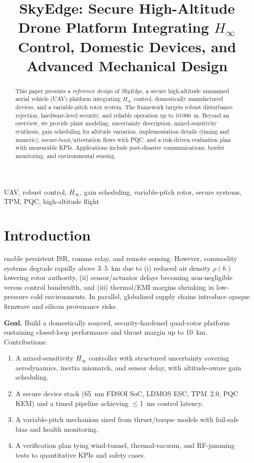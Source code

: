 \documentclass[conference]{IEEEtran}
\title{SkyEdge: Secure High-Altitude Drone Platform Integrating $H_\infty$ Control, Domestic Devices, and Advanced Mechanical Design}
\author{
\IEEEauthorblockN{Shinichi Samizo}
\IEEEauthorblockA{Independent Semiconductor Researcher \\
Project Design Hub, Samizo-AITL \\
\textit{Email:} \href{mailto:shin3t72@gmail.com}{shin3t72@gmail.com} \\
\textit{GitHub:} \href{https://github.com/Samizo-AITL}{Samizo-AITL}}
}
\begin{document}
\maketitle

\begin{abstract}
This paper presents a \emph{reference design} of \emph{SkyEdge}, a secure high-altitude unmanned aerial vehicle (UAV) platform integrating $H_\infty$ control, domestically manufactured devices, and a variable-pitch rotor system. The framework targets robust disturbance rejection, hardware-level security, and reliable operation up to 10\,000~m. Beyond an overview, we provide plant modeling, uncertainty description, mixed-sensitivity synthesis, gain scheduling for altitude variation, implementation details (timing and numeric), secure-boot/attestation flows with PQC, and a risk-driven evaluation plan with measurable KPIs. Applications include post-disaster communications, border monitoring, and environmental sensing.
\end{abstract}

\begin{IEEEkeywords}
UAV, robust control, $H_\infty$, gain scheduling, variable-pitch rotor, secure systems, TPM, PQC, high-altitude flight
\end{IEEEkeywords}

\section{Introduction}
 enable persistent ISR, comms relay, and remote sensing. However, commodity systems degrade rapidly above 3--5~km due to (i) reduced air density $\rho(h)$ lowering rotor authority, (ii) sensor/actuator delays becoming non-negligible versus control bandwidth, and (iii) thermal/EMI margins shrinking in low-pressure cold environments. In parallel, globalized supply chains introduce opaque firmware and silicon provenance risks.

\textbf{Goal.} Build a domestically sourced, security-hardened quad-rotor platform sustaining closed-loop performance and thrust margin up to 10~km. Contributions:
\begin{enumerate}
  \item A mixed-sensitivity $H_\infty$ controller with structured uncertainty covering aerodynamics, inertia mismatch, and sensor delay, with altitude-aware gain scheduling.
  \item A secure device stack (65~nm FDSOI SoC, LDMOS ESC, TPM~2.0, PQC KEM) and a timed pipeline achieving $\le$1~ms control latency.
  \item A variable-pitch mechanism sized from thrust/torque models with fail-safe bias and health monitoring.
  \item A verification plan tying wind-tunnel, thermal-vacuum, and RF-jamming tests to quantitative KPIs and safety cases.
\end{enumerate}
\end{document}
